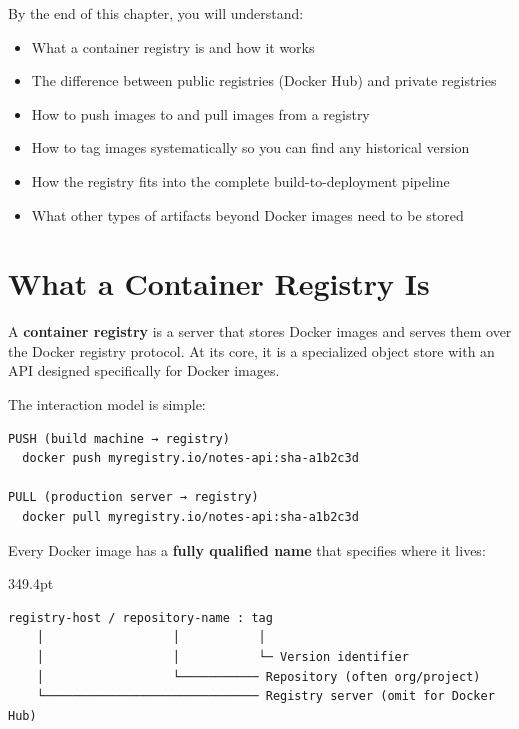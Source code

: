 \begin{objectives}

By the end of this chapter, you will understand:

\begin{itemize}
\tightlist
\item
  What a container registry is and how it works
\item
  The difference between public registries (Docker Hub) and private registries
\item
  How to push images to and pull images from a registry
\item
  How to tag images systematically so you can find any historical version
\item
  How the registry fits into the complete build-to-deployment pipeline
\item
  What other types of artifacts beyond Docker images need to be stored
\end{itemize}

\end{objectives}

\setcounter{section}{0}
\section{What a Container Registry Is}\label{19-artifact-storage:191-what-a-container-registry-is}

A \textbf{container registry} is a server that stores Docker images and serves them over the Docker registry protocol. At its core, it is a specialized object store with an API designed specifically for Docker images.

The interaction model is simple:

\begin{outputbox}[short]
\begin{Verbatim}[fontsize=\codesize, breaklines, breakanywhere, breaksymbolleft={\tiny\textcolor{muted}{$\hookrightarrow$}}]
PUSH (build machine → registry)
  docker push myregistry.io/notes-api:sha-a1b2c3d

PULL (production server → registry)
  docker pull myregistry.io/notes-api:sha-a1b2c3d
\end{Verbatim}
\end{outputbox}

\noindent{}Every Docker image has a \textbf{fully qualified name} that specifies where it lives:

\begin{diagrambox}[short]{349.4pt}
\begin{Verbatim}[fontsize=\fontsize{9.0}{8.55}\selectfont]
registry-host / repository-name : tag
    │                  │           │
    │                  │           └─ Version identifier
    │                  └─────────── Repository (often org/project)
    └────────────────────────────── Registry server (omit for Docker Hub)
\end{Verbatim}
\end{diagrambox}


